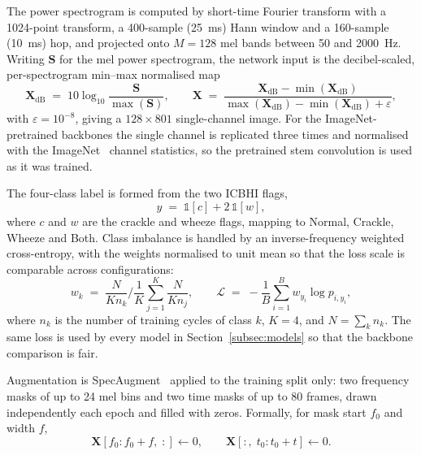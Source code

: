 \documentclass[journal,onecolumn]{IEEEtran}
\begin{document}
The power spectrogram is computed by short-time Fourier transform with a 1024-point
transform, a 400-sample (25~ms) Hann window and a 160-sample (10~ms) hop, and
projected onto $M=128$ mel bands between 50 and 2000~Hz. Writing $\mathbf{S}$ for
the mel power spectrogram, the network input is the decibel-scaled, per-spectrogram
min--max normalised map
\begin{equation}
\mathbf{X}_{\mathrm{dB}} \;=\; 10\log_{10}\!\frac{\mathbf{S}}{\max(\mathbf{S})},
\qquad
\mathbf{X} \;=\;
\frac{\mathbf{X}_{\mathrm{dB}} - \min(\mathbf{X}_{\mathrm{dB}})}
     {\max(\mathbf{X}_{\mathrm{dB}}) - \min(\mathbf{X}_{\mathrm{dB}}) + \varepsilon},
\label{eq:logmel}
\end{equation}
with $\varepsilon = 10^{-8}$, giving a $128\times801$ single-channel image. For
the ImageNet-pretrained backbones the single channel is replicated three times and
normalised with the ImageNet~\cite{deng2009imagenet} channel statistics, so the
pretrained stem convolution is used as it was trained.

The four-class label is formed from the two ICBHI flags,
\begin{equation}
y \;=\; \mathbb{1}[c] + 2\,\mathbb{1}[w],
\label{eq:label}
\end{equation}
where $c$ and $w$ are the crackle and wheeze flags, mapping to Normal, Crackle,
Wheeze and Both. Class imbalance is handled by an inverse-frequency weighted
cross-entropy, with the weights normalised to unit mean so that the loss scale is
comparable across configurations:
\begin{equation}
w_k \;=\; \frac{N}{K n_k} \Big/ \frac{1}{K}\sum_{j=1}^{K}\frac{N}{K n_j},
\qquad
\mathcal{L} \;=\; -\frac{1}{B}\sum_{i=1}^{B} w_{y_i}\log p_{i,y_i},
\label{eq:weights}
\end{equation}
where $n_k$ is the number of training cycles of class $k$, $K=4$, and $N=\sum_k n_k$.
The same loss is used by every model in Section~\ref{subsec:models} so that the
backbone comparison is fair.

Augmentation is SpecAugment~\cite{park2019specaugment} applied to the training
split only: two frequency masks of up to 24 mel bins and two time masks of up to
80 frames, drawn independently each epoch and filled with zeros. Formally, for
mask start $f_0$ and width $f$,
\begin{equation}
\mathbf{X}[f_0{:}f_0{+}f,\;:] \leftarrow 0, \qquad
\mathbf{X}[:,\;t_0{:}t_0{+}t] \leftarrow 0 .
\label{eq:specaug}
\end{equation}
\end{document}
